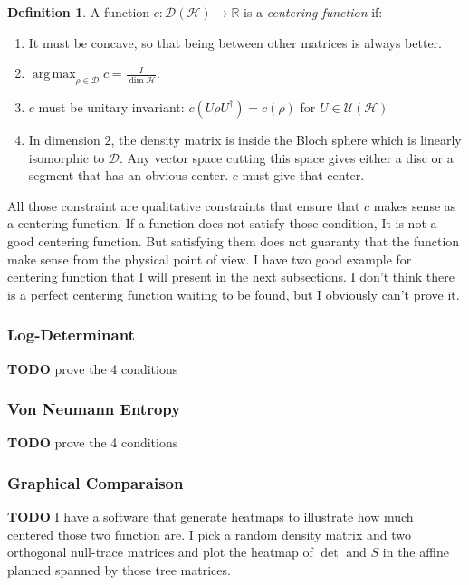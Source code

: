 \documentclass[10pt]{report}
\theoremstyle{plain}
\theoremstyle{definition}
\newtheorem{defn}{Definition}[chapter]
\theoremstyle{remark}
\newcommand{\R}{\ensuremath{\mathbb{R}}}
\newcommand{\TODO}{\textbf{TODO}}
\DeclareMathOperator{\argmax}{arg\,max}
\begin{document}
\begin{defn}
  A function $c : \mathcal{D}(\mathcal{H}) \to \R$ is a \emph{centering function} if:

  \begin{enumerate}
  \item It must be concave, so that being between other matrices is always better.
  \item $\displaystyle \argmax_{\rho \in \mathcal{D}} c = \frac I{\dim
      \mathcal{H}}$.
  \item $c$ must be unitary invariant: $c(U\rho U^\dagger) = c(\rho)$ for $U \in \mathcal{U}(\mathcal{H})$
  \item In dimension $2$, the density matrix is inside the Bloch sphere which is
    linearly isomorphic to $\mathcal{D}$. Any vector space cutting this space
    gives either a disc or a segment that has an obvious center. $c$ must give
    that center.
  \end{enumerate}
\end{defn}

All those constraint are qualitative constraints that ensure that $c$ makes sense
as a centering function. If a function does not satisfy those condition, It is
not a good centering function. But satisfying them does not guaranty that the function
make sense from the physical point of view. I have two good example for
centering function that I will present in the next subsections. I don't think
there is a perfect centering function waiting to be found, but I obviously can't
prove it.

\subsubsection{Log-Determinant}

\TODO{} prove the 4 conditions

\subsubsection{Von Neumann Entropy}


\TODO{} prove the 4 conditions

\subsubsection{Graphical Comparaison}

\TODO{} I have a software that generate heatmaps to illustrate how much centered
those two function are. I pick a random density matrix and two orthogonal null-trace matrices
and plot the heatmap of $\det$ and $S$ in the affine planned spanned by those
tree matrices.
\end{document}
